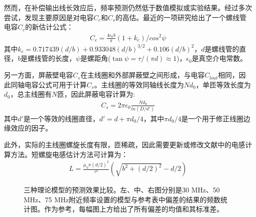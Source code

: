然而，在补偿输出线长效应后，频率预测仍然低于数值模拟或实验结果。经过多次尝试，发现主要原因是对电容$C_c$和$C_s$的高估。最近的一项研究\cite[p52,f5.3]{article_2010}给出了一个螺线管电容$C_c$的新估计公式：
\begin{align}
    C_c=\frac{4\epsilon_0 b}{\pi}(1+k_c)/cos^2\psi 	\label{eq:helical_C_c_new}
\end{align}
其中$k_c=0.717439(d/b)+0.933048(d/b)^{3/2}+0.106(d/b)^2$，$d$是螺线管的直径，$b$是螺线管的长度，$\psi$是螺距角($\tan\psi=\tau/(\pi d)\approx 1$)，$\epsilon_0$是真空介电常数。

另一方面，屏蔽壁电容$C_s$在主线圈和外部屏蔽壁之间形成，与电容$C_{lout}$相同，因此同轴电容公式可用于计算$C_s$。主线圈的等效同轴线长度为$Nd_0$，单匝等效长度为$d_0$，总主线圈有$N$匝，因此屏蔽电容计算为:
\begin{align}
    C_s=2\pi\epsilon_0 \frac{Nd_0}{ln(D/d')} \label{eq:helical_C_s_new}
\end{align}
其中$d'$是一个等效的线圈直径，$d'=d+\pi d_0/4$，其中$\pi d_0/4$是一个用于修正线圈边缘效应的因子。

此外，实际的主线圈螺旋长度有限，匝稀疏，因此需要更新或修改文献\cite[]{Siverns_Simkins_Weidt_Hensinger_2012}中的电感计算方法。短螺旋电感估计方法可计算为：
\begin{align}
    L=\frac{\mu_0 \pi (d/2)^2 }{\tau^2} (\sqrt{b^2+(d/2)^2}-d/2) \label{eq:helical_L_new}
\end{align}

\begin{figure}
    \centering
    \caption[三种理论模型的预测效果比较]{三种理论模型的预测效果比较。左、中、右图分别是30 MHz、50 MHz、75 MHz附近频率设置的模型与参考表中偏差的结果的频数统计图。作为参考，每幅图上方给出了所有偏差的均值和其标准差。\label{fig:helical_freqmodelcompare}}

\end{figure}


